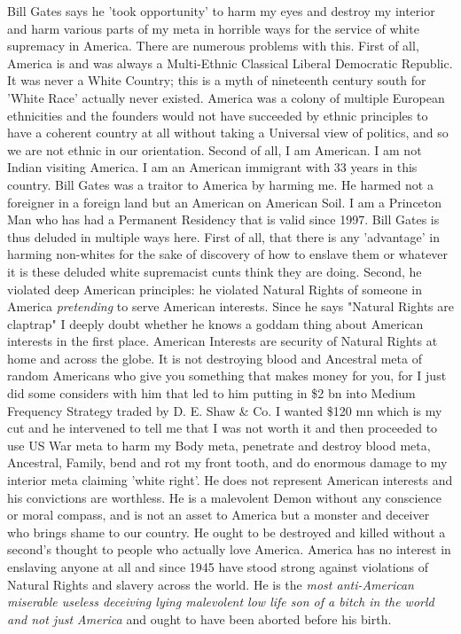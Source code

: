 \documentclass{amsart}
\begin{document}
Bill Gates says he 'took opportunity' to harm my eyes and destroy my interior and harm various parts of my meta in horrible ways for the service of white supremacy in America.  There are numerous problems with this.  First of all, America is and was always a Multi-Ethnic Classical Liberal Democratic Republic.  It was never a White Country; this is a myth of nineteenth century south for 'White Race' actually never existed.  America was a colony of multiple European ethnicities and the founders would not have succeeded by ethnic principles to have a coherent country at all without taking a Universal view of politics, and so we are not ethnic in our orientation.  Second of all, I am American.  I am not Indian visiting America.  I am an American immigrant with 33 years in this country.  Bill Gates was a traitor to America by harming me.  He harmed not a foreigner in a foreign land but an American on American Soil.  I am a Princeton Man who has had a Permanent Residency that is valid since 1997.  Bill Gates is thus deluded in multiple ways here.  First of all, that there is any 'advantage' in harming non-whites for the sake of discovery of how to enslave them or whatever it is these deluded white supremacist cunts think they are doing. Second, he violated deep American principles:  he violated Natural Rights of someone in America {\em pretending} to serve American interests.  Since he says "Natural Rights are claptrap" I deeply doubt whether he knows a goddam thing about American interests in the first place.  American Interests are security of Natural Rights at home and across the globe.  It is not destroying blood and Ancestral meta of random Americans who give you something that makes money for you, for I just did some considers with him that led to him putting in \$2 bn into Medium Frequency Strategy traded by D. E. Shaw \& Co. I wanted \$120 mn which is my cut and he intervened to tell me that I was not worth it and then proceeded to use US War meta to harm my Body meta, penetrate and destroy blood meta, Ancestral, Family, bend and rot my front tooth, and do enormous damage to my interior meta claiming 'white right'.  He does not represent American interests and his convictions are worthless.  He is a malevolent Demon without any conscience or moral compass, and is not an asset to America but a monster and deceiver who brings shame to our country.  He ought to be destroyed and killed without a second's thought to people who actually love America.  America has no interest in enslaving anyone at all and since 1945 have stood strong against violations of Natural Rights and slavery across the world.  He is the {\em most anti-American miserable useless deceiving lying malevolent low life son of a bitch in the world and not just America} and ought to have been aborted before his birth.
\end{document}
